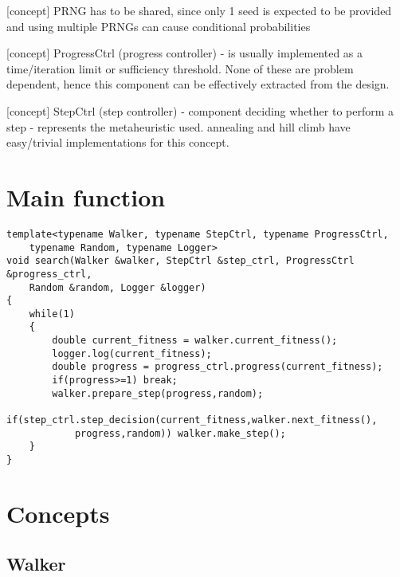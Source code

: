 [concept] PRNG has to be shared, since only 1 seed is expected to be provided and using multiple PRNGs can cause conditional probabilities

[concept] ProgressCtrl (progress controller) - is usually implemented as a time/iteration limit or sufficiency threshold.
None of these are problem dependent, hence this component can be effectively extracted from the design.

[concept] StepCtrl (step controller) - component deciding whether to perform a step - represents the metaheuristic used.
annealing and hill climb have easy/trivial implementations for this concept.

\section{Main function}

\begin{lstlisting}
template<typename Walker, typename StepCtrl, typename ProgressCtrl,
	typename Random, typename Logger>
void search(Walker &walker, StepCtrl &step_ctrl, ProgressCtrl &progress_ctrl,
	Random &random, Logger &logger)
{
	while(1)
	{
		double current_fitness = walker.current_fitness();
		logger.log(current_fitness);
		double progress = progress_ctrl.progress(current_fitness);
		if(progress>=1) break;
		walker.prepare_step(progress,random);
		if(step_ctrl.step_decision(current_fitness,walker.next_fitness(),
			progress,random)) walker.make_step();
	}
}
\end{lstlisting}

\section{Concepts}

\subsection{Walker}

